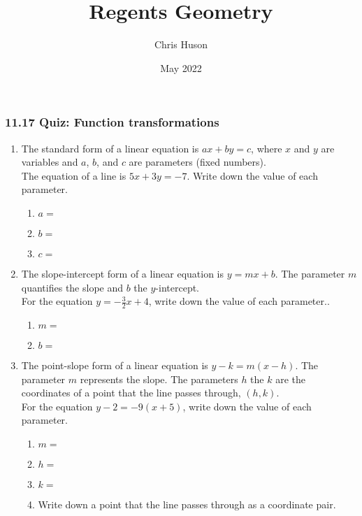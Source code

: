\documentclass[12pt, twoside]{article}
\title{Regents Geometry}
\author{Chris Huson}
\date{May 2022}
\begin{document}
\subsubsection*{11.17 Quiz: Function transformations}
\begin{enumerate}
\item The standard form of a linear equation is $ax+by=c$, where $x$ and $y$ are variables and $a$, $b$, and $c$ are parameters (fixed numbers).\\[0.25cm]
The equation of a line is $5x+3y=-7$. Write down the value of each parameter.
  \begin{enumerate}
    \item $a=$
    \vspace{0.5cm}
    \item $b=$
    \vspace{0.5cm}
    \item $c=$
  \end{enumerate} \vspace{0.2cm}

\item The slope-intercept form of a linear equation is $y=mx+b$. The parameter $m$ quantifies the slope and $b$ the $y$-intercept.\\[0.25cm]
For the equation $y=-\frac{3}{2}x+4$, write down the value of each parameter..
  \begin{enumerate}
    \item $m=$
    \vspace{0.5cm}
    \item $b=$
    \vspace{0.2cm}
  \end{enumerate}

\item The point-slope form of a linear equation is $y-k=m(x-h)$. The parameter $m$ represents the slope. The parameters $h$ the $k$ are the coordinates of a point that the line passes through,
 $(h, k)$.\\[0.25cm]
For the equation $y-2=-9(x+5)$, write down the value of each parameter.
  \begin{enumerate}
    \item $m=$
    \vspace{0.5cm}
    \item $h=$
    \vspace{0.5cm}
    \item $k=$
    \vspace{0.5cm}
    \item Write down a point that the line passes through as a coordinate pair.
  \end{enumerate}
  

\end{enumerate}
\end{document}
